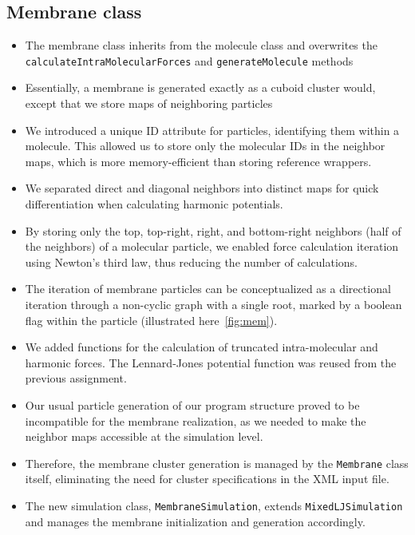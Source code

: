 \documentclass{article}
\begin{document}
    \subsection{Membrane class}
    \label{sec:mem:mem}
        \begin{itemize}
            \item The membrane class inherits from the molecule class and overwrites the \texttt{calculateIntraMolecularForces} and \texttt{generateMolecule} methods
            \item Essentially, a membrane is generated exactly as a cuboid cluster would, except that we store maps of neighboring particles 
            \item We introduced a unique ID attribute for particles, identifying them within a molecule. This allowed us to store only the molecular IDs in the neighbor maps, which is more memory-efficient than storing reference wrappers.
            \item We separated direct and diagonal neighbors into distinct maps for quick differentiation when calculating harmonic potentials.
            \item By storing only the top, top-right, right, and bottom-right neighbors (half of the neighbors) of a molecular particle, we enabled force calculation iteration using Newton's third law, thus reducing the number of calculations.
            \item The iteration of membrane particles can be conceptualized as a directional iteration through a non-cyclic graph with a single root, marked by a boolean flag within the particle (illustrated here\ \ref{fig:mem}).
            \item We added functions for the calculation of truncated intra-molecular and harmonic forces. The Lennard-Jones potential function was reused from the previous assignment.
            \item Our usual particle generation of our program structure proved to be incompatible for the membrane realization, as we needed to make the neighbor maps accessible at the simulation level.
            \item Therefore, the membrane cluster generation is managed by the \texttt{Membrane} class itself, eliminating the need for cluster specifications in the XML input file.
            \item The new simulation class, \texttt{MembraneSimulation}, extends \texttt{MixedLJSimulation} and manages the membrane initialization and generation accordingly.
        \end{itemize}
\end{document}
